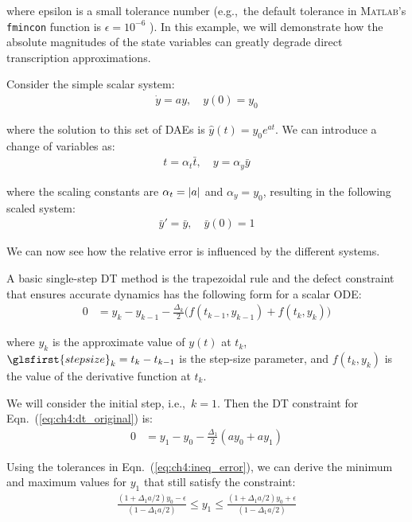 \noindent where \gls{epsilon} is a small tolerance number (e.g.,~the default tolerance in \textsc{Matlab}'s \texttt{fmincon} function is $\epsilon = 10^{-6}$ \cite{matlab-fmincon}).
In this example, we will demonstrate how the absolute magnitudes of the state variables can greatly degrade direct transcription approximations.

Consider the simple scalar system:
\begin{align}
\label{eq:ch4:dt_original}
\dot{y} = a y, \quad y(0) = y_0
\end{align}

\noindent where the solution to this set of DAEs is $\hat{y}(t) = y_0 e^{at}$. We can introduce a change of variables as:
\begin{align*}
t = \alpha_t \bar{t}, \quad y = \alpha_y \bar{y}
\end{align*}

\noindent where the scaling constants are $\alpha_t = \lvert a\rvert$ and $\alpha_y = y_0$, resulting in the following scaled system:
\begin{align}
\bar{y}' = \bar{y}, \quad \bar{y}(0) = 1
\end{align}

\noindent We can now see how the relative error is influenced by the different systems.

A basic single-step DT method is the trapezoidal rule and the defect constraint that ensures accurate dynamics has the following form for a scalar ODE:
\begin{align}
\label{eq:ch4:defect}
0 &= y_k - y_{k-1} - \frac{\Delta_k}{2}\Big( f(t_{k-1}, y_{k-1}) + f(t_k, y_{k}) \Big)
\end{align}

\noindent where $y_k$ is the approximate value of $y(t)$ at $t_k$, $\glsfirst{stepsize}_k = t_k - t_{k-1}$ is the step-size parameter, and $f(t_k, y_{k})$ is the value of the derivative function at $t_k$.

We will consider the initial step, i.e.,~$k=1$. Then the DT constraint for Eqn.~(\ref{eq:ch4:dt_original}) is:
\begin{align}
0 &= y_1 - y_{0} - \frac{\Delta_1}{2} \left( a y_{0} + a y_1 \right)
\end{align}

Using the tolerances in Eqn.~(\ref{eq:ch4:ineq_error}), we can derive the minimum and maximum values for $y_1$ that still satisfy the constraint:
\begin{align}
\frac{\left(1+\Delta_1 a/2\right) y_0 - \epsilon}{\left(1-\Delta_1 a/2\right)} \leq y_1 \leq \frac{\left(1+\Delta_1 a/2\right) y_0 + \epsilon}{\left(1-\Delta_1 a/2\right)}
\end{align}

